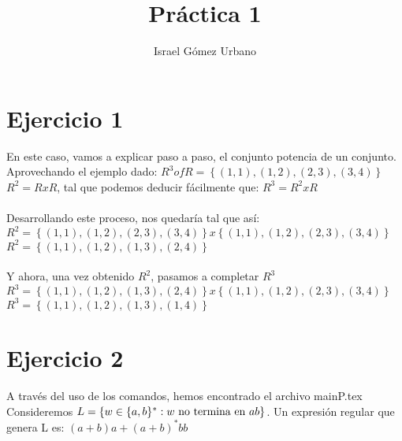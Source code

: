 \documentclass[11pt]{article}
\title{\textbf{Práctica 1}}
\author{Israel Gómez Urbano}
\date{}
\begin{document}
\maketitle
\thispagestyle{empty}

\section{Ejercicio 1}
En este caso, vamos a explicar paso a paso, el conjunto potencia de un conjunto.
Aprovechando el ejemplo dado: $ R^3 of R = {\left\lbrace(1, 1),(1, 2),(2, 3),(3, 4)\right\rbrace} $
\\


$ R^2 = R x R $, tal que podemos deducir fácilmente que: $ R^3 = R^2 x R $
\\
\\
Desarrollando este proceso, nos quedaría tal que así:
\\

$R^2 = {\left\lbrace(1, 1),(1, 2),(2, 3),(3, 4)\right\rbrace} x  {\left\lbrace(1, 1),(1, 2),(2, 3),(3, 4)\right\rbrace} $
\\

$R^2 = {\left\lbrace(1, 1),(1, 2),(1, 3),(2, 4)\right\rbrace} $
\\
\\
Y ahora, una vez obtenido $R^2$, pasamos a completar $R^3$
\\

$R^3 = {\left\lbrace(1, 1),(1, 2),(1, 3),(2, 4)\right\rbrace} x  {\left\lbrace(1, 1),(1, 2),(2, 3),(3, 4)\right\rbrace} $
\\

$R^3 = {\left\lbrace(1, 1),(1, 2),(1, 3),(1, 4)\right\rbrace} $

\section{Ejercicio 2}
A través del uso de los comandos, hemos encontrado el archivo mainP.tex
\\


Consideremos $L=\{w\in \{a,b\}^* : w \textnormal{ no termina en } ab\}$. Un expresión regular que genera L es: $(a+b)a+(a+b)^* bb$
\end{document}
